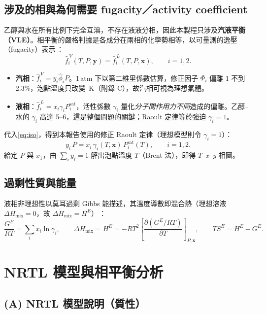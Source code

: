 \documentclass[UTF8,a4paper,11pt,fontset=none,zihao=-4]{ctexart}
\numberwithin{equation}{section}\renewcommand{\theequation}{\arabic{section}.\arabic{equation}}
\numberwithin{figure}{section}\renewcommand{\thefigure}{\arabic{section}.\arabic{figure}}
\numberwithin{table}{section}\renewcommand{\thetable}{\arabic{section}.\arabic{table}}
\newcommand{\sat}{\mathrm{sat}}
\begin{document}
\subsection{涉及的相與為何需要 fugacity／activity coefficient}
乙醇與水在所有比例下完全互溶，不存在液液分相，因此本製程只涉及\textbf{汽液平衡（VLE）}。相平衡的嚴格判據是各成分在兩相的化學勢相等，以可量測的逸壓（fugacity）表示\,\cite{sandler}：
\begin{equation}
\hat f_i^{\,V}(T,P,\mathbf y)=\hat f_i^{\,L}(T,P,\mathbf x),\qquad i=1,2. \label{eq:iso}
\end{equation}
\begin{itemize}
\item \textbf{汽相}：$\hat f_i^{\,V}=y_i\hat\phi_iP$。1\,atm 下以第二維里係數估算，修正因子 $\Phi_i$ 偏離 1 不到 2.3\%，泡點溫度只改變 \nvirdT\,K（附錄 C），故汽相可視為理想氣體。
\item \textbf{液相}：$\hat f_i^{\,L}=x_i\gamma_iP_i^{\sat}$，活性係數 $\gamma_i$ 量化\emph{分子間作用力不同}造成的偏離。乙醇--水的 $\gamma_i$ 高達 5--6，這是整個問題的關鍵；Raoult 定律等於強迫 $\gamma_i=1$。
\end{itemize}
代入\cref{eq:iso}，得到本報告使用的修正 Raoult 定律（理想模型則令 $\gamma_i=1$）：
\begin{equation}
y_i\,P=x_i\,\gamma_i(T,\mathbf x)\,P_i^{\sat}(T),\qquad i=1,2. \label{eq:mraoult}
\end{equation}
給定 $P$ 與 $x_1$，由 $\sum_iy_i=1$ 解出泡點溫度 $T$（Brent 法），即得 $T$--$x$--$y$ 相圖。

\subsection{過剩性質與能量}
液相非理想性以莫耳過剩 Gibbs 能描述，其溫度導數即混合熱（理想溶液 $\Delta H_{\mathrm{mix}}=0$，故 $\Delta H_{\mathrm{mix}}=H^E$）\,\cite{sandler}：
\begin{equation}
\frac{G^E}{RT}=\sum_i x_i\ln\gamma_i,\qquad
\Delta H_{\mathrm{mix}}=H^E=-RT^{2}\left[\frac{\partial(G^E/RT)}{\partial T}\right]_{P,\mathbf x},\qquad TS^E=H^E-G^E. \label{eq:gh}
\end{equation}

\section{NRTL 模型與相平衡分析}\label{sec:nrtl}

\subsection{(A) NRTL 模型說明（質性）}
\end{document}
